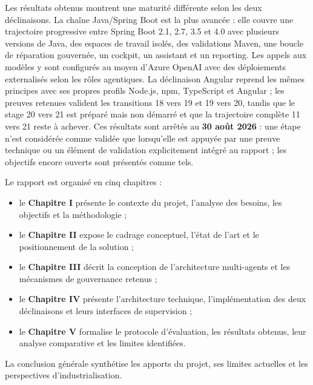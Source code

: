 Les résultats obtenus montrent une maturité différente selon les deux déclinaisons. La chaîne Java/Spring Boot est la plus avancée : elle couvre une trajectoire progressive entre Spring Boot 2.1, 2.7, 3.5 et 4.0 avec plusieurs versions de Java, des espaces de travail isolés, des validations Maven, une boucle de réparation gouvernée, un cockpit, un assistant et un reporting. Les appels aux modèles y sont configurés au moyen d'Azure OpenAI avec des déploiements externalisés selon les rôles agentiques. La déclinaison Angular reprend les mêmes principes avec ses propres profils Node.js, npm, TypeScript et Angular ; les preuves retenues valident les transitions 18 vers 19 et 19 vers 20, tandis que le stage 20 vers 21 est préparé mais non démarré et que la trajectoire complète 11 vers 21 reste à achever. Ces résultats sont arrêtés au \textbf{30 août 2026} : une étape n'est considérée comme validée que lorsqu'elle est appuyée par une preuve technique ou un élément de validation explicitement intégré au rapport ; les objectifs encore ouverts sont présentés comme tels.

Le rapport est organisé en cinq chapitres :

\begin{itemize}
    \item le \textbf{Chapitre I} présente le contexte du projet, l'analyse des besoins, les objectifs et la méthodologie ;
    \item le \textbf{Chapitre II} expose le cadrage conceptuel, l'état de l'art et le positionnement de la solution ;
    \item le \textbf{Chapitre III} décrit la conception de l'architecture multi-agents et les mécanismes de gouvernance retenus ;
    \item le \textbf{Chapitre IV} présente l'architecture technique, l'implémentation des deux déclinaisons et leurs interfaces de supervision ;
    \item le \textbf{Chapitre V} formalise le protocole d'évaluation, les résultats obtenus, leur analyse comparative et les limites identifiées.
\end{itemize}

La conclusion générale synthétise les apports du projet, ses limites actuelles et les perspectives d'industrialisation.
